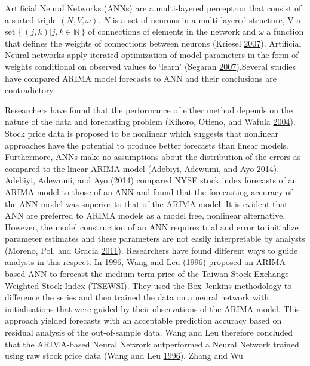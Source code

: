 \documentclass[12pt,preprint, authoryear]{elsarticle}
\numberwithin{equation}{section}
\numberwithin{figure}{section}
\numberwithin{table}{section}
\begin{document}
Artificial Neural Networks (ANNs) are a multi-layered perceptron that
consist of a sorted triple \((N, V, \omega)\). \(N\) is a set of neurons
in a multi-layered structure, V a set
\(\{\,(j,k)|j,k \in \mathbb{N}\,\}\) of connections of elements in the
network and \(\omega\) a function that defines the weights of
connections between neurons (Kriesel
\protect\hyperlink{ref-kriesel2007brief}{2007}). Artificial Neural
networks apply iterated optimization of model parameters in the form of
weights conditional on observed values to `learn' (Segaran
\protect\hyperlink{ref-segaran2007programming}{2007}).Several studies
have compared ARIMA model forecasts to ANN and their conclusions are
contradictory.

Researchers have found that the performance of either method depends on
the nature of the data and forecasting problem (Kihoro, Otieno, and
Wafula \protect\hyperlink{ref-kihoro2004seasonal}{2004}). Stock price
data is proposed to be nonlinear which suggests that nonlinear
approaches have the potential to produce better forecasts than linear
models. Furthermore, ANNs make no assumptions about the distribution of
the errors as compared to the linear ARIMA model (Adebiyi, Adewumi, and
Ayo \protect\hyperlink{ref-adebiyi2014comparison}{2014}). Adebiyi,
Adewumi, and Ayo (\protect\hyperlink{ref-adebiyi2014comparison}{2014})
compared NYSE stock index forecasts of an ARIMA model to those of an ANN
and found that the forecasting accuracy of the ANN model was superior to
that of the ARIMA model. It is evident that ANN are preferred to ARIMA
models as a model free, nonlinear alternative. However, the model
construction of an ANN requires trial and error to initialize parameter
estimates and these parameters are not easily interpretable by analysts
(Moreno, Pol, and Gracia
\protect\hyperlink{ref-moreno2011artificial}{2011}). Researchers have
found different ways to guide analysts in this respect. In 1996, Wang
and Leu (\protect\hyperlink{ref-wang1996stock}{1996}) proposed an
ARIMA-based ANN to forecast the medium-term price of the Taiwan Stock
Exchange Weighted Stock Index (TSEWSI). They used the Box-Jenkins
methodology to difference the series and then trained the data on a
neural network with initialisations that were guided by their
observations of the ARIMA model. This approach yielded forecasts with an
acceptable prediction accuracy based on residual analysis of the
out-of-sample data. Wang and Leu therefore concluded that the
ARIMA-based Neural Network outperformed a Neural Network trained using
raw stock price data (Wang and Leu
\protect\hyperlink{ref-wang1996stock}{1996}). Zhang and Wu
\end{document}
